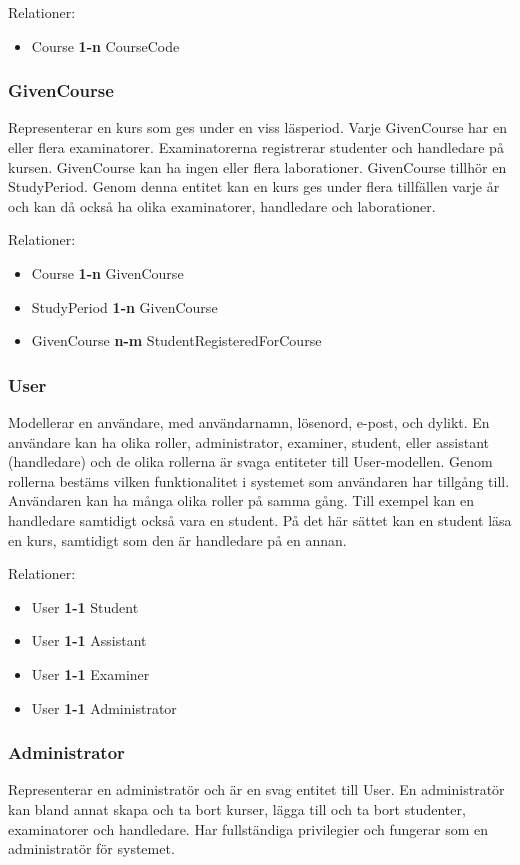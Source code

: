 Relationer:
\begin{itemize}
  \item Course {\bf 1-n} CourseCode
\end{itemize}


\subsubsection{GivenCourse}
Representerar en kurs som ges under en viss läsperiod. Varje GivenCourse har en eller flera examinatorer. Examinatorerna registrerar studenter och handledare på kursen. GivenCourse kan ha ingen eller flera laborationer. GivenCourse tillhör en StudyPeriod. Genom denna entitet kan en kurs ges under flera tillfällen varje år och kan då också ha olika examinatorer, handledare och laborationer.

Relationer:
\begin{itemize}
  \item Course {\bf 1-n} GivenCourse
  \item StudyPeriod {\bf 1-n} GivenCourse
  \item GivenCourse {\bf n-m} StudentRegisteredForCourse 
\end{itemize}


\subsubsection{User}
Modellerar en användare, med användarnamn, lösenord, e-post, och dylikt. En användare kan ha olika roller, administrator, examiner, student, eller assistant (handledare) och de olika rollerna är svaga entiteter till User-modellen. Genom rollerna bestäms vilken funktionalitet i systemet som användaren har tillgång till. Användaren kan ha många olika roller på samma gång. Till exempel kan en handledare samtidigt också vara en student. På det här sättet kan en student läsa en kurs, samtidigt som den är handledare på en annan. 

Relationer:
\begin{itemize}
  \item User {\bf 1-1} Student
  \item User {\bf 1-1} Assistant
  \item User {\bf 1-1} Examiner
  \item User {\bf 1-1} Administrator
\end{itemize}


\subsubsection{Administrator}
Representerar en administratör och är en svag entitet till User. En administratör kan bland annat skapa och ta bort kurser, lägga till och ta bort studenter, examinatorer och handledare. Har fullständiga privilegier och fungerar som en administratör för systemet.

